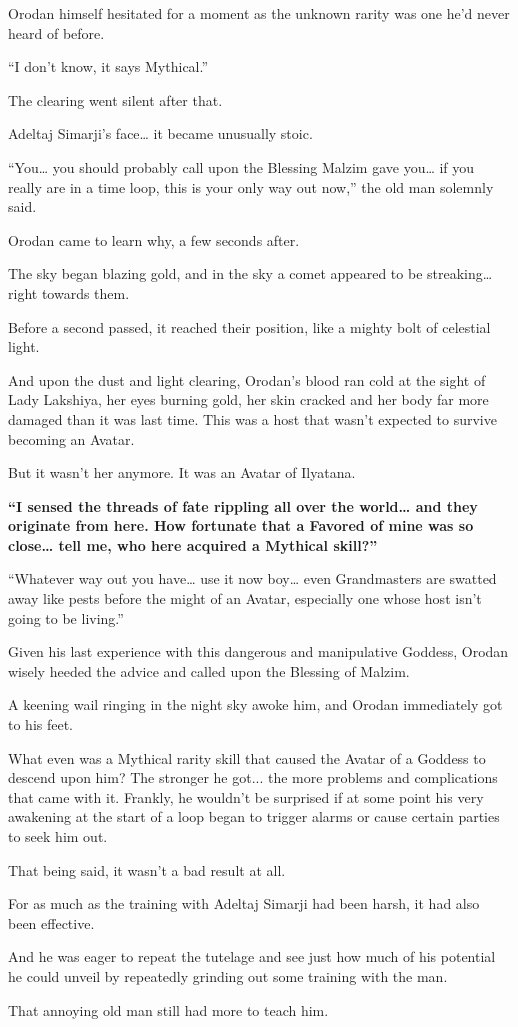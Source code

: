 \documentclass[a4paper,10pt]{book}
\begin{document}
Orodan himself hesitated for a moment as the unknown rarity was one he’d never heard of before.\par
“I don’t know, it says Mythical.”\par
The clearing went silent after that.\par
Adeltaj Simarji’s face… it became unusually stoic.\par
“You… you should probably call upon the Blessing Malzim gave you… if you really are in a time loop, this is your only way out now,” the old man solemnly said.\par
Orodan came to learn why, a few seconds after.\par
The sky began blazing gold, and in the sky a comet appeared to be streaking… right towards them.\par
Before a second passed, it reached their position, like a mighty bolt of celestial light.\par
And upon the dust and light clearing, Orodan’s blood ran cold at the sight of Lady Lakshiya, her eyes burning gold, her skin cracked and her body far more damaged than it was last time. This was a host that wasn’t expected to survive becoming an Avatar.\par
But it wasn’t her anymore. It was an Avatar of Ilyatana.\par
\textbf{“I sensed the threads of fate rippling all over the world… and they originate from here. How fortunate that a Favored of mine was so close… tell me, who here acquired a Mythical skill?”}\par
“Whatever way out you have… use it now boy… even Grandmasters are swatted away like pests before the might of an Avatar, especially one whose host isn’t going to be living.”\par
Given his last experience with this dangerous and manipulative Goddess, Orodan wisely heeded the advice and called upon the Blessing of Malzim.\par
\par
A keening wail ringing in the night sky awoke him, and Orodan immediately got to his feet.\par
What even was a Mythical rarity skill that caused the Avatar of a Goddess to descend upon him? The stronger he got... the more problems and complications that came with it. Frankly, he wouldn't be surprised if at some point his very awakening at the start of a loop began to trigger alarms or cause certain parties to seek him out.\par
That being said, it wasn't a bad result at all.\par
For as much as the training with Adeltaj Simarji had been harsh, it had also been effective.\par
And he was eager to repeat the tutelage and see just how much of his potential he could unveil by repeatedly grinding out some training with the man.\par
That annoying old man still had more to teach him.\par
\end{document}
